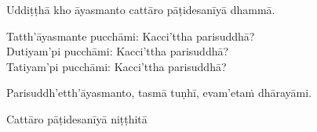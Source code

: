 \medskip

\begin{center}
Uddiṭṭhā kho āyasmanto cattāro pāṭidesanīyā dhammā.

\smallskip

Tatth'āyasmante pucchāmi: Kacci'ttha parisuddhā?\\
Dutiyam'pi pucchāmi: Kacci'ttha parisuddhā?\\
Tatiyam'pi pucchāmi: Kacci'ttha parisuddhā?

\smallskip

Parisuddh'etth'āyasmanto, tasmā tuṇhī, evam'etaṁ dhārayāmi.
\end{center}

\begin{outro}
  Cattāro pāṭidesanīyā niṭṭhitā
\end{outro}

\clearpage
